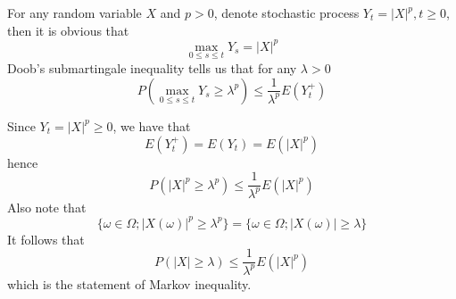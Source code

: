 \documentclass{homework}
\begin{document}
    \problem
    For any random variable $X$ and $p>0$, denote stochastic process
    $Y_t=|X|^p,t\geq 0$,
    then it is obvious that
    \[\max_{0\leq s\leq t}Y_s=|X|^p\]
    Doob's submartingale inequality tells us that
    for any $\lambda>0$
    \[P\left(\max_{0\leq s\leq t}Y_s\geq\lambda^p\right)
    \leq\frac{1}{\lambda^p}E(Y_t^+)\]

    Since $Y_t=|X|^p\geq 0$, we have that
    \[E(Y_t^+)=E(Y_t)=E(|X|^p)\]
    hence
    \[P(|X|^p\geq\lambda^p)\leq\frac{1}{\lambda^p}E(|X|^p)\]
    Also note that
    \[\{\omega\in\Omega;|X(\omega)|^p\geq\lambda^p\}
    =\{\omega\in\Omega;|X(\omega)|\geq\lambda\}\]
    It follows that
    \[P(|X|\geq\lambda)\leq\frac{1}{\lambda^p}E(|X|^p)\]
    which is the statement of Markov inequality.

    \problem
    \newcommand{\absdelta}{\left|X\left(\frac{i+1}{2^n}\right)-X\left(\frac{i}{2^n}\right)\right|}
\end{document}
